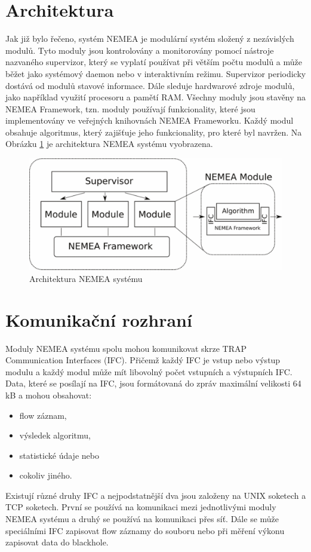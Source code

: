 \documentclass[thesis=B,czech,hidelinks]{FITthesis}[2019/03/21]
\begin{document}
    \section{Architektura}
    Jak již bylo řečeno, systém NEMEA \cite{NEMEA} je modulární systém složený z nezávislých modulů. Tyto moduly jsou kontrolovány a monitorovány pomocí nástroje nazvaného supervizor, který se vyplatí používat při větším počtu modulů a může běžet jako systémový daemon nebo v interaktivním režimu. Supervizor periodicky dostává od modulů stavové informace. Dále sleduje hardwarové zdroje modulů, jako například využití procesoru a pamětí RAM. Všechny moduly jsou stavěny na NEMEA Framework, tzn. moduly používají funkcionality, které jsou implementovány ve veřejných knihovnách NEMEA Frameworku. Každý modul obsahuje algoritmus, který zajišťuje jeho funkcionality, pro které byl navržen. Na Obrázku \ref{NEMEA_architecture} je architektura NEMEA systému vyobrazena. 
    \begin{figure}[h]
        \centering
        \includegraphics[width=\textwidth]{NEMEAArchitecture.pdf}
        \caption[Architektura NEMEA systému]{ Architektura NEMEA systému \cite{NEMEA}}
        \label{NEMEA_architecture}
    \end{figure}
    \newpage
    \section{Komunikační rozhraní}
    Moduly NEMEA systému spolu mohou komunikovat skrze TRAP Communication Interfaces (IFC). Přičemž každý IFC je vstup nebo výstup modulu a každý modul může mít libovolný počet vstupních a výstupních IFC. Data, které se posílají na IFC, jsou formátovaná do zpráv maximální velikosti 64 kB  a mohou obsahovat:
    \begin{itemize}
        \item flow záznam,
        \item výsledek algoritmu,
        \item statistické údaje nebo
        \item cokoliv jiného.
    \end{itemize}
    Existují různé druhy IFC a nejpodstatnější dva jsou založeny na UNIX soketech a TCP soketech. První se používá na komunikaci mezi jednotlivými moduly NEMEA systému a druhý se používá na komunikaci přes síť. Dále se může speciálními IFC zapisovat flow záznamy do souboru nebo při měření výkonu zapisovat data do blackhole.
    
\end{document}
